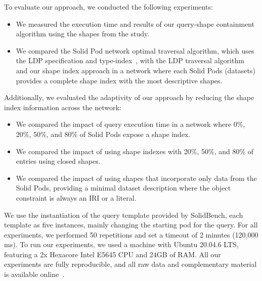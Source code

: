 To evaluate our approach, we conducted the following experiments:
\begin{itemize}
   \item We measured the execution time and results of our query-shape containment algorithm using the shapes from the study.
   \item We compared the Solid Pod network optimal traversal algorithm, which uses the LDP specification and type-index~\cite{Taelman2023}, with the LDP traversal algorithm~\cite{Taelman2023} and our shape index approach in a network where each Solid Pods (datasets) provides a complete shape index with the most descriptive shapes.
\end{itemize}
Additionally, we evaluated the adaptivity of our approach by reducing the shape index information across the network:
\begin{itemize}
   \item We compared the impact of query execution time in a network where 0\%, 20\%, 50\%, and 80\% of Solid Pods expose a shape index.
   \item We compared the impact of using shape indexes with 20\%, 50\%, and 80\% of entries using closed shapes.
   \item We compared the impact of using shapes that incorporate only data from the Solid Pods, providing a minimal dataset description where the object constraint is always an IRI or a literal.
\end{itemize}
We use the instantiation of the query template provided by SolidBench, each template as five instances, mainly changing the starting pod for the query.
For all experiments, we performed 50 repetitions and set a timeout of 2 minutes (120,000 ms).
To run our experiments, we used a machine with Ubuntu 20.04.6 LTS, featuring a 2x Hexacore Intel E5645 CPU and 24GB of RAM.
All our experiments are fully reproducible, and all raw data and complementary material is available online~.


